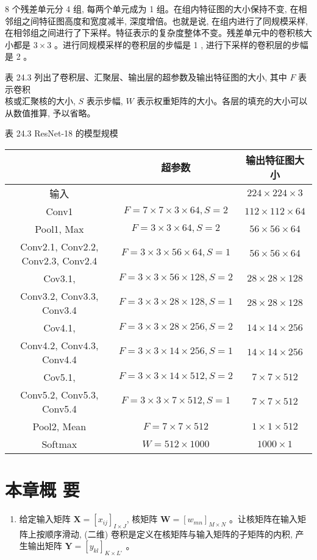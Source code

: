 \documentclass[10pt]{article}
\begin{document}
8 个残差单元分 4 组, 每两个单元成为 1 组。在组内特征图的大小保持不变, 在相邻组之间特征图高度和宽度减半, 深度增倍。也就是说, 在组内进行了同规模采样, 在相邻组之间进行了下采样。特征表示的复杂度整体不变。残差单元中的卷积核大小都是 $3 \times 3$ 。进行同规模采样的卷积层的步幅是 1 , 进行下采样的卷积层的步幅是 2 。

表 24.3 列出了卷积层、汇聚层、输出层的超参数及输出特征图的大小, 其中 $F$ 表示卷积\\
核或汇聚核的大小, $S$ 表示步幅, $W$ 表示权重矩阵的大小。各层的填充的大小可以从数值推算, 予以省略。

表 24.3 ResNet-18 的模型规模

\begin{center}
\begin{tabular}{c|c|c}
\hline
 & 超参数 & 输出特征图大小 \\
\hline
输入 &  & $224 \times 224 \times 3$ \\
\hline
Conv1 & $F=7 \times 7 \times 3 \times 64, S=2$ & $112 \times 112 \times 64$ \\
\hline
Pool1, Max & $F=3 \times 3 \times 64, S=2$ & $56 \times 56 \times 64$ \\
\hline
Conv2.1, Conv2.2, Conv2.3, Conv2.4 & $F=3 \times 3 \times 56 \times 64, S=1$ & $56 \times 56 \times 64$ \\
\hline
Cov3.1, & $F=3 \times 3 \times 56 \times 128, S=2$ & $28 \times 28 \times 128$ \\
\hline
Conv3.2, Conv3.3, Conv3.4 & $F=3 \times 3 \times 28 \times 128, S=1$ & $28 \times 28 \times 128$ \\
\hline
Cov4.1, & $F=3 \times 3 \times 28 \times 256, S=2$ & $14 \times 14 \times 256$ \\
\hline
Conv4.2, Conv4.3, Conv4.4 & $F=3 \times 3 \times 14 \times 256, S=1$ & $14 \times 14 \times 256$ \\
\hline
Cov5.1, & $F=3 \times 3 \times 14 \times 512, S=2$ & $7 \times 7 \times 512$ \\
\hline
Conv5.2, Conv5.3, Conv5.4 & $F=3 \times 3 \times 7 \times 512, S=1$ & $7 \times 7 \times 512$ \\
\hline
Pool2, Mean & $F=7 \times 7 \times 512$ & $1 \times 1 \times 512$ \\
\hline
Softmax & $W=512 \times 1000$ & $1000 \times 1$ \\
\hline
\end{tabular}
\end{center}

\section*{本章概 要}
\begin{enumerate}
  \item 给定输入矩阵 $\boldsymbol{X}=\left[x_{i j}\right]_{I \times J}$, 核矩阵 $\boldsymbol{W}=\left[w_{m n}\right]_{M \times N}$ 。让核矩阵在输入矩阵上按顺序滑动, (二维) 卷积是定义在核矩阵与输入矩阵的子矩阵的内积, 产生输出矩阵 $\boldsymbol{Y}=\left[y_{k l}\right]_{K \times L^{\circ}}$ 。
\end{enumerate}
\end{document}
